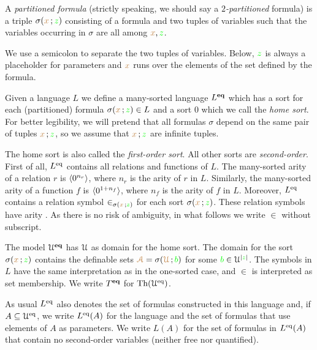 \documentclass[creche.tex]{subfiles}
\begin{document}
\begin{definition}\label{def_partitioned_fla}
A \emph{partitioned formula\/}  (strictly speaking, we should say a \emph{$2$-partitioned\/} formula) is a triple $\sigma({\color{brown} x}\,;{\color{green} z})$ consisting of a formula and two tuples of variables such that the variables occurring in $\sigma$ are all among ${\color{brown} x},{\color{green} z}$.\QED
\end{definition}

We use a semicolon to separate the two tuples of variables. Below, ${\color{green} z}$ is always a placeholder for parameters and ${\color{brown} x}$ runs over the elements of the set defined by the formula.

Given a language $L$ we define a many-sorted language \emph{$L^{\rm\textbf{eq}}$\/} which has a sort for each (partitioned) formula $\sigma({\color{brown} x}\,;{\color{green} z})\in L$ and a sort \emph{$0$\/} which we call the \emph{home sort}. For better legibility, we will pretend that all formulas $\sigma$ depend on the same pair of tuples ${\color{brown} x}\,;{\color{green} z}$, so we assume that ${\color{brown} x}\,;{\color{green} z}$ are infinite tuples. 

The home sort is also called the \emph{first-order sort}. All other sorts are \emph{second-order}. First of all, $L^{{\rm eq}}$ contains all relations and functions of $L$. The many-sorted arity of a relation $r$ is $\langle0^{n_r}\rangle$, where $n_r$ is the arity of $r$ in $L$. Similarly, the many-sorted arity of a function $f$ is $\langle0^{1+n_f}\rangle$, where $n_f$ is the arity of $f$ in $L$. Moreover, $L^{{\rm eq}}$ contains a relation symbol $\in_{\sigma({\color{brown} x}\,;{\color{green} z})}$ for each sort $\sigma({\color{brown} x}\,;{\color{green} z})$. These relation symbols have arity . As there is no risk of ambiguity, in what follows we write $\in$ without subscript.

The model \emph{$\EuScript U^{\rm\textbf{eq}}$\/} has $\EuScript U$ as domain for the home sort. The domain for the sort $\sigma({\color{brown} x}\,;{\color{green} z})$ contains the definable sets ${\color{brown}\EuScript A}=\sigma({\color{brown}\EuScript U}\,;{\color{green} b})$ for some ${\color{green} b}\in\EuScript U^{|{\color{green} z}|}$. The symbols in $L$ have the same interpretation as in the one-sorted case, and $\in$ is interpreted as set membership. We write \emph{$T^{\rm\textbf{eq}}$\/} for $\textrm{Th}(\EuScript U^{{\rm eq}})$.

As usual \emph{$L^{{\rm eq}}$\/} also denotes the set of formulas constructed in this language and, if $A\subseteq\EuScript U^{{\rm eq}}$, we write  \emph{$L^{{\rm eq}}(A)$\/} for the language and the set of formulas that use elements of $A$ as parameters. We write \emph{$L(A)$\/} for the set of formulas in $L^{{\rm eq}}(A)$ that contain no second-order variables (neither free nor quantified).  
\end{document}
